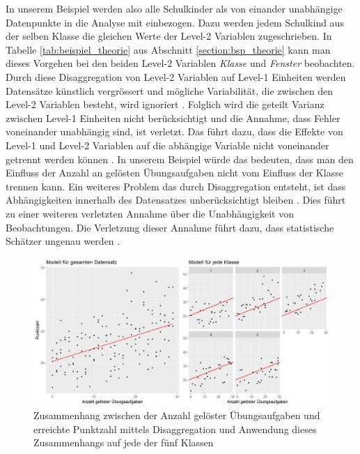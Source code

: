 \documentclass[12pt]{article}\usepackage[]{graphicx}\usepackage[]{color}
\begin{document}
In unserem Beispiel werden also alle Schulkinder als von einander unabhängige Datenpunkte in die Analyse mit einbezogen. Dazu werden jedem Schulkind aus der selben Klasse die gleichen Werte der Level-2 Variablen zugeschrieben. In Tabelle \ref{tab:beispiel_theorie} aus Abschnitt \ref{section:bsp_theorie} kann man dieses Vorgehen bei den beiden Level-2 Variablen \textit{Klasse} und \textit{Fenster} beobachten. Durch diese Disaggregation von Level-2 Variablen auf Level-1 Einheiten werden Datensätze künstlich vergrössert und mögliche Variabilität, die zwischen den Level-2 Variablen besteht, wird ignoriert \citep{SnijdersTomA.B2012Ma:a, woltman2012introduction}. Folglich wird die geteilt Varianz zwischen Level-1 Einheiten nicht berücksichtigt und die Annahme, dass Fehler voneinander unabhängig sind, ist verletzt. Das führt dazu, dass die Effekte von Level-1 und Level-2 Variablen auf die abhängige Variable nicht voneinander getrennt werden können \citep{woltman2012introduction}. In unserem Beispiel würde das bedeuten, dass man den Einfluss der Anzahl an gelösten Übungsaufgaben nicht vom Einfluss der Klasse trennen kann. Ein weiteres Problem das durch Disaggregation entsteht, ist dass Abhängigkeiten innerhalb des Datensatzes unberücksichtigt bleiben \citep{woltman2012introduction}. Dies führt zu einer weiteren verletzten Annahme über die Unabhängigkeit von Beobachtungen. Die Verletzung dieser Annahme führt dazu, dass statistische Schätzer ungenau werden \citep{andrew_data, SnijdersTomA.B2012Ma:a, woltman2012introduction}.

\begin{figure}[t!]
\centering
\includegraphics[width = \textwidth]{disaggregation_combined}
\caption{Zusammenhang zwischen der Anzahl gelöster Übungsaufgaben und erreichte Punktzahl mittels Disaggregation und Anwendung dieses Zusammenhangs auf jede der fünf Klassen}
\label{fig:disaggregation}
\end{figure}
\end{document}
